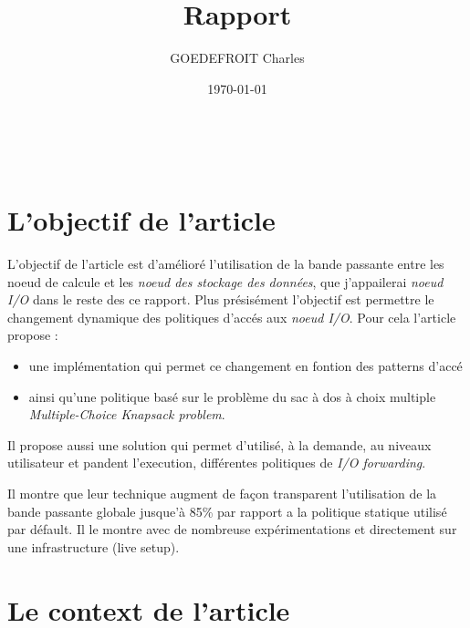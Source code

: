 \documentclass[10pt, a4paper]{article}
\title{Rapport}
\author{GOEDEFROIT Charles}
\date{\today}
\begin{document}
\begin{titlepage}
	\centering
  \ {} %
	\vfill
	\vspace{1cm}
	{\scshape\Huge\MyTitle\par}
	\vspace{0.5cm}
	{\Large\MySubject\par}
	\vspace{1cm}
	\MyAuthor
	\vfill
	{\large\MyDate\par}
\end{titlepage}

\newpage


\section{L'objectif de l'article}


L'objectif de l'article est d'amélioré l'utilisation de la bande passante entre les noeud de calcule et les \emph{noeud des stockage des données}, que j'appailerai \emph{noeud I/O} dans le reste des ce rapport. Plus présisément l'objectif est permettre le changement dynamique des politiques d'accés aux \emph{noeud I/O}. Pour cela l'article propose :
\begin{itemize}
  \item une implémentation qui permet ce changement en fontion des patterns d'accé
  \item ainsi qu'une politique basé sur le problème du sac à dos à choix multiple \emph{Multiple-Choice Knapsack problem}.
\end{itemize}

Il propose aussi une solution qui permet d'utilisé, à la demande, au niveaux utilisateur et
pandent l'execution, différentes politiques de \emph{I/O forwarding}.

Il montre que leur technique augment de façon transparent l'utilisation de la bande passante
globale jusque'à 85\% par rapport a la politique statique utilisé par défault. Il le montre
avec de nombreuse expérimentations et directement sur une infrastructure (live setup).
\section{Le context de l'article}
\end{document}
